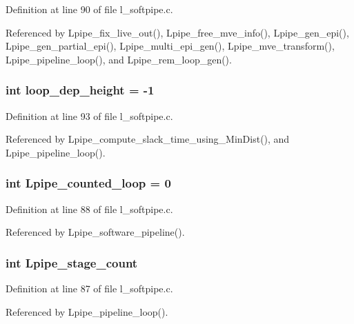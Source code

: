 Definition at line 90 of file l\_\-softpipe.c.

Referenced by Lpipe\_\-fix\_\-live\_\-out(), Lpipe\_\-free\_\-mve\_\-info(), Lpipe\_\-gen\_\-epi(), Lpipe\_\-gen\_\-partial\_\-epi(), Lpipe\_\-multi\_\-epi\_\-gen(), Lpipe\_\-mve\_\-transform(), Lpipe\_\-pipeline\_\-loop(), and Lpipe\_\-rem\_\-loop\_\-gen().
\subsubsection{\setlength{\rightskip}{0pt plus 5cm}int \bf{loop\_\-dep\_\-height} = -1}\label{l__softpipe_8c_4dc68702d9b52f9ccb3dc704c3382dad}




Definition at line 93 of file l\_\-softpipe.c.

Referenced by Lpipe\_\-compute\_\-slack\_\-time\_\-using\_\-Min\-Dist(), and Lpipe\_\-pipeline\_\-loop().
\subsubsection{\setlength{\rightskip}{0pt plus 5cm}int \bf{Lpipe\_\-counted\_\-loop} = 0}\label{l__softpipe_8c_e41610bb03edbaeb7c02cfcc7fc4467b}




Definition at line 88 of file l\_\-softpipe.c.

Referenced by Lpipe\_\-software\_\-pipeline().
\subsubsection{\setlength{\rightskip}{0pt plus 5cm}int \bf{Lpipe\_\-stage\_\-count}}\label{l__softpipe_8c_e9b3310fa8a82cd6903c833cef98effd}




Definition at line 87 of file l\_\-softpipe.c.

Referenced by Lpipe\_\-pipeline\_\-loop().
